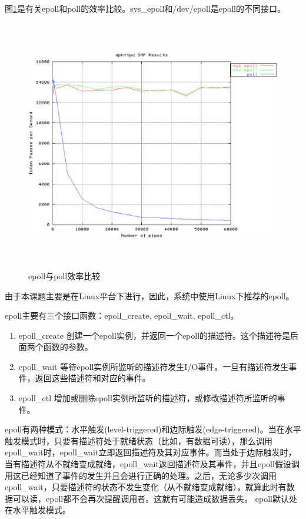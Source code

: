 \documentclass[twoside, xetex]{report}
\begin{document}
	图\ref{epollvspoll}是有关epoll和poll的效率比较。sys\_epoll和/dev/epoll是epoll的不同接口。
	\begin{figure}[htbp]
	\centering
	\includegraphics[height=11cm, width=15cm]{pics/epollvspoll.eps}
	\caption{epoll与poll效率比较}
	\label{epollvspoll}
	\end{figure}
	
	由于本课题主要是在Linux平台下进行，因此，系统中使用Linux下推荐的epoll。
	
	epoll主要有三个接口函数：epoll\_create, epoll\_wait, epoll\_ctl。
	\begin{enumerate}
		\item epoll\_create 创建一个epoll实例，并返回一个epoll的描述符。这个描述符是后面两个函数的参数。
		\item epoll\_wait 等待epoll实例所监听的描述符发生I/O事件。一旦有描述符发生事件，返回这些描述符和对应的事件。
		\item epoll\_ctl 增加或删除epoll实例所监听的描述符，或修改描述符所监听的事件。
	\end{enumerate}
	
	epoll有两种模式：水平触发(level-triggered)和边际触发(edge-triggered)。当在水平触发模式时，只要有描述符处于就绪状态（比如，有数据可读），那么调用epoll\_wait时，epoll\_wait立即返回描述符及其对应事件。而当处于边际触发时，当有描述符从不就绪变成就绪，epoll\_wait返回描述符及其事件，并且epoll假设调用这已经知道了事件的发生并且会进行正确的处理。之后，无论多少次调用epoll\_wait，只要描述符的状态不发生变化（从不就绪变成就绪），就算此时有数据可以读，epoll都不会再次提醒调用者。这就有可能造成数据丢失。
	epoll默认处在水平触发模式。
	
\end{document}
